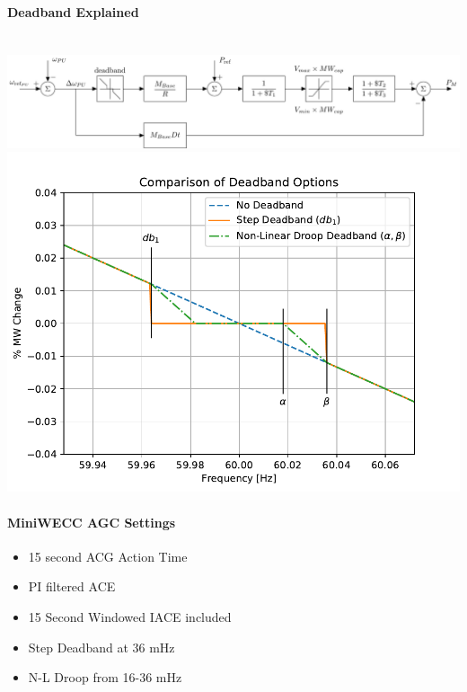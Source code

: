 \documentclass[12pt]{article}
\begin{document}
\begin{multicols}{2}
\paragraph{Deadband Explained} \ \\
\includegraphics[width=\linewidth]{tgov1DB}\\
\includegraphics[width=\linewidth]{dbAction2}

\paragraph{MiniWECC AGC Settings}

\begin{itemize}
\itemsep0em 
\item 15 second ACG Action Time
\item PI filtered ACE
\item 15 Second Windowed IACE included
\item Step Deadband at 36 mHz
\item N-L Droop from 16-36 mHz
\end{itemize}
\vfill\null
\columnbreak

\end{multicols}
\end{document}

